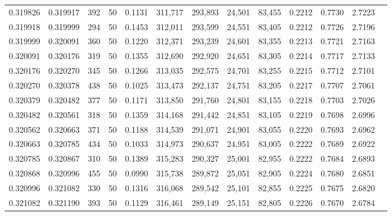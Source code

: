\begin{tabular}{rrrrrrrrrrrrr}
0.319826 & 0.319917 &   392 &  50 &                                     0.1131 & 311,717 & 293,893 &  24,501 &  83,455 & 0.2212 & 0.7730 & 2.7223 \\
0.319918 & 0.319999 &   294 &  50 &                                     0.1453 & 312,011 & 293,599 &  24,551 &  83,405 & 0.2212 & 0.7726 & 2.7196 \\
0.319999 & 0.320091 &   360 &  50 &                                     0.1220 & 312,371 & 293,239 &  24,601 &  83,355 & 0.2213 & 0.7721 & 2.7163 \\
0.320091 & 0.320176 &   319 &  50 &                                     0.1355 & 312,690 & 292,920 &  24,651 &  83,305 & 0.2214 & 0.7717 & 2.7133 \\
0.320176 & 0.320270 &   345 &  50 &                                     0.1266 & 313,035 & 292,575 &  24,701 &  83,255 & 0.2215 & 0.7712 & 2.7101 \\
0.320270 & 0.320378 &   438 &  50 &                                     0.1025 & 313,473 & 292,137 &  24,751 &  83,205 & 0.2217 & 0.7707 & 2.7061 \\
0.320379 & 0.320482 &   377 &  50 &                                     0.1171 & 313,850 & 291,760 &  24,801 &  83,155 & 0.2218 & 0.7703 & 2.7026 \\
0.320482 & 0.320561 &   318 &  50 &                                     0.1359 & 314,168 & 291,442 &  24,851 &  83,105 & 0.2219 & 0.7698 & 2.6996 \\
0.320562 & 0.320663 &   371 &  50 &                                     0.1188 & 314,539 & 291,071 &  24,901 &  83,055 & 0.2220 & 0.7693 & 2.6962 \\
0.320663 & 0.320785 &   434 &  50 &                                     0.1033 & 314,973 & 290,637 &  24,951 &  83,005 & 0.2222 & 0.7689 & 2.6922 \\
0.320785 & 0.320867 &   310 &  50 &                                     0.1389 & 315,283 & 290,327 &  25,001 &  82,955 & 0.2222 & 0.7684 & 2.6893 \\
0.320868 & 0.320996 &   455 &  50 &                                     0.0990 & 315,738 & 289,872 &  25,051 &  82,905 & 0.2224 & 0.7680 & 2.6851 \\
0.320996 & 0.321082 &   330 &  50 &                                     0.1316 & 316,068 & 289,542 &  25,101 &  82,855 & 0.2225 & 0.7675 & 2.6820 \\
0.321082 & 0.321190 &   393 &  50 &                                     0.1129 & 316,461 & 289,149 &  25,151 &  82,805 & 0.2226 & 0.7670 & 2.6784 \\

\end{tabular}
